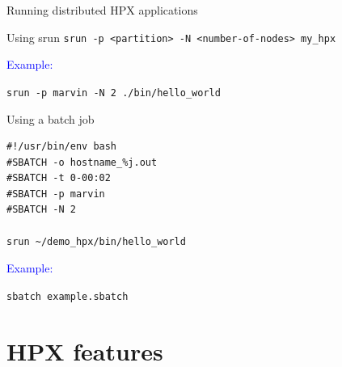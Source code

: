\documentclass[\classoption]{beamer}
\begin{document}
\begin{frame}[fragile]{Running distributed HPX applications}

\begin{block}{Using srun}
\lstinline|srun -p <partition> -N <number-of-nodes> my_hpx |

\textcolor{blue}{Example:}

\lstinline|srun -p marvin -N 2 ./bin/hello_world|
\end{block}

\begin{block}{Using a batch job}

\begin{lstlisting}
#!/usr/bin/env bash
#SBATCH -o hostname_%j.out
#SBATCH -t 0-00:02
#SBATCH -p marvin
#SBATCH -N 2

srun ~/demo_hpx/bin/hello_world
\end{lstlisting}

\textcolor{blue}{Example:}

\lstinline|sbatch example.sbatch|

\end{block}
\end{frame}

\section{HPX features}
\end{document}
